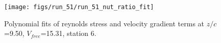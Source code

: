 \begin{figure}[H]
\centering
\texttt{[image: figs/run\_51/run\_51\_nut\_ratio\_fit]}
\caption{Polynomial fits of reynolds stress and velocity gradient terms at $z/c$=9.50, $V_{free}$=15.31, station 6.}
\label{fig:run_51_nut_ratio_fit}
\end{figure}


